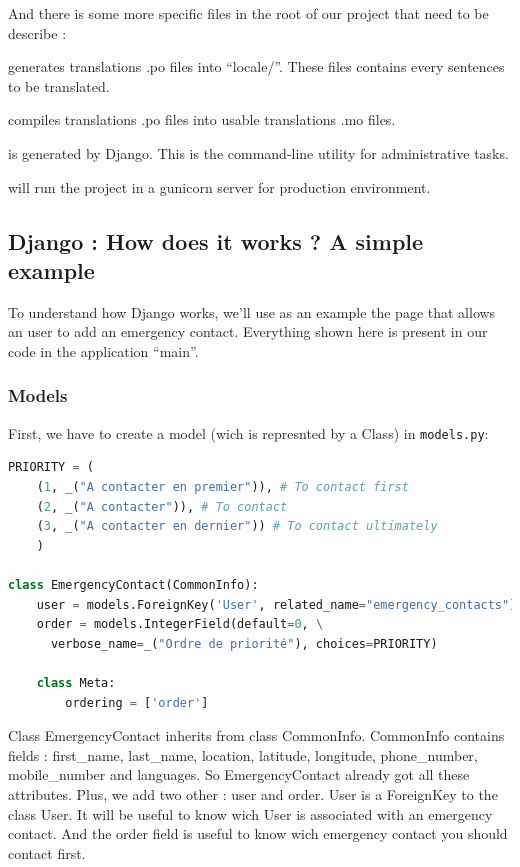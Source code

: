 \documentclass[11pt, a4paper]{article}   	%
\begin{document}
And there is some more specific files in the root of our project that need to be describe :
\begin{description}[noitemsep]

\item[- make\_locale.sh] generates translations .po files into ``locale/''. These files contains every sentences to be translated.
\item[- compile\_locale.sh] compiles translations .po files into usable translations .mo files.
\item[- manage.py] is generated by Django. This is the command-line utility for administrative tasks. 
\item[- start.sh] will run the project in a gunicorn server for production environment.
\end{description}

\subsection{Django : How does it works ? A simple example}

To understand how Django works, we'll use as an example the page that allows an user to add an emergency contact. Everything shown here is present in our code in the application ``main''.

\subsubsection{Models}
First, we have to create a model (wich is represnted by a Class) in \texttt{models.py}:

\begin{lstlisting}[language=Python, basicstyle=\footnotesize]
PRIORITY = (
    (1, _("A contacter en premier")), # To contact first
    (2, _("A contacter")), # To contact 
    (3, _("A contacter en dernier")) # To contact ultimately
    )

class EmergencyContact(CommonInfo):
    user = models.ForeignKey('User', related_name="emergency_contacts")
    order = models.IntegerField(default=0, \
      verbose_name=_("Ordre de priorité"), choices=PRIORITY)

    class Meta:
        ordering = ['order']
\end{lstlisting}

Class EmergencyContact inherits from class CommonInfo. CommonInfo contains fields : first\_name, last\_name, location, latitude, longitude, phone\_number, mobile\_number and languages. So EmergencyContact already got all these attributes. Plus, we add two other : user and order. User is a ForeignKey to the class User. It will be useful to know wich User is associated with an emergency contact. And the order field is useful to know wich emergency contact you should contact first.
\end{document}
